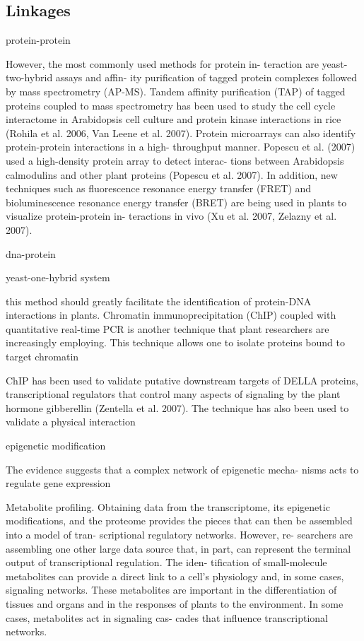 \documentclass[a4paper, oneside]{report}
\begin{document}
\subsection*{Linkages}

protein-protein

However, the
most commonly used methods for protein in-
teraction are yeast-two-hybrid assays and affin-
ity purification of tagged protein complexes
followed by mass spectrometry (AP-MS).
Tandem affinity purification (TAP) of tagged
proteins coupled to mass spectrometry has
been used to study the cell cycle interactome
in Arabidopsis cell culture and protein kinase
interactions in rice (Rohila et al. 2006, Van
Leene et al. 2007). Protein microarrays can also
identify protein-protein interactions in a high-
throughput manner. Popescu et al. (2007) used
a high-density protein array to detect interac-
tions between Arabidopsis calmodulins and other
plant proteins (Popescu et al. 2007). In addition,
new techniques such as fluorescence resonance
energy transfer (FRET) and bioluminescence
resonance energy transfer (BRET) are being
used in plants to visualize protein-protein in-
teractions in vivo (Xu et al. 2007, Zelazny et al.
2007).

dna-protein

yeast-one-hybrid system

 this method
should greatly facilitate the identification of
protein-DNA interactions in plants.
Chromatin immunoprecipitation (ChIP)
coupled with quantitative real-time PCR
is another technique that plant researchers
are increasingly employing. This technique
allows one to isolate proteins bound to target
chromatin

 ChIP has been
used to validate putative downstream targets
of DELLA proteins, transcriptional regulators
that control many aspects of signaling by the
plant hormone gibberellin (Zentella et al.
2007). The technique has also been used
to validate a physical interaction 

epigenetic modification

The evidence suggests
that a complex network of epigenetic mecha-
nisms acts to regulate gene expression

Metabolite profiling. Obtaining data from
the transcriptome, its epigenetic modifications,
and the proteome provides the pieces that
can then be assembled into a model of tran-
scriptional regulatory networks. However, re-
searchers are assembling one other large data
source that, in part, can represent the terminal
output of transcriptional regulation. The iden-
tification of small-molecule metabolites can
provide a direct link to a cell’s physiology and,
in some cases, signaling networks. 
 These metabolites are important in
the differentiation of tissues and organs and in
the responses of plants to the environment. In
some cases, metabolites act in signaling cas-
cades that influence transcriptional networks.
\end{document}
